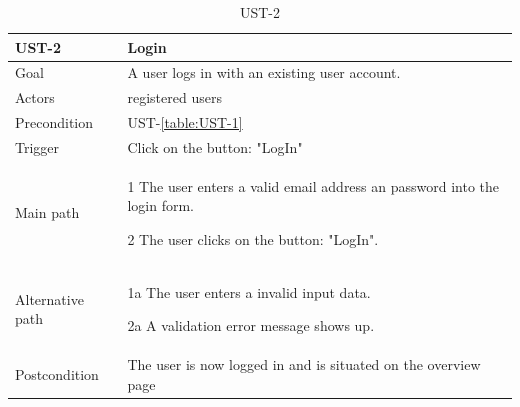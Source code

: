\documentclass[titlepage, 12pt]{article}
\newenvironment{packed_itemize}{
  \vspace{-\topsep}
  \begin{itemize}
    \setlength{\itemsep}{1pt}
    \setlength{\parskip}{0pt}
    \setlength{\parsep}{0pt}
  }{\end{itemize}}
\begin{document}
\begin{table}[H]
  \begin{center}

    \begin{tabular}{p{4cm}|p{10cm}}
      \textbf{UST-2}   & \textbf{Login}                                                 \\
      \hline
      Goal             & A user logs in with an existing user account.                  \\
      \hline
      Actors           & registered users                                               \\
      \hline
      Precondition     & UST-\ref{table:UST-1}                                          \\
      \hline
      Trigger          & Click on the button: "LogIn"                                   \\
      \hline
      Main path        &
      \begin{packed_itemize}
        \item [1] The user enters a valid email address an password into the login form.
        \item [2] The user clicks on the button: "LogIn".
      \end{packed_itemize}                                                         \\
      \hline
      Alternative path &
      \begin{packed_itemize}
        \item [1a] The user enters a invalid input data.
        \item [2a] A validation error message shows up.
      \end{packed_itemize}                                                         \\
      \hline
      Postcondition    & The user is now logged in and is situated on the overview page \\
    \end{tabular}

    \caption{UST-2}
    \label{table:UST-2}

  \end{center}
\end{table}
\end{document}
